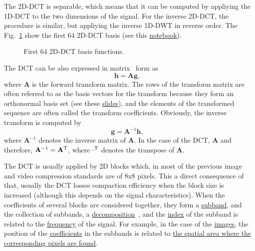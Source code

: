 The 2D-DCT is separable, which means that it can be computed by
appliying the 1D-DCT to the two dimensions of the signal. For the
inverse 2D-DCT, the procedure is similar, but appliying the inverse
1D-DWT in reverse order. The Fig.~\ref{fig:2D-DCT_basis} show the
first 64 2D-DCT basis (see this
\href{https://github.com/Sistemas-Multimedia/Sistemas-Multimedia.github.io/blob/master/milestones/07-DCT/DCT_basis.ipynb}{notebook}).

\begin{figure}
  \centering
  \caption{First 64 2D-DCT basis functions.}
  \label{fig:2D-DCT_basis}
\end{figure}

The DCT can be also expressed in matrix~\cite{sayood2017introduction}
form as
\begin{equation}
  {\mathbf h} = {\mathbf A}{\mathbf g},
\end{equation}
where ${\mathbf A}$ is the forward transform matrix. The rows of the
transform matrix are often referred to as the basis vectors for the
transform because they form an orthonormal basis set (see these
\href{https://cseweb.ucsd.edu/classes/fa17/cse166-a/lec13.pdf}{slides}),
and the elements of the transformed sequence are often called the
transform coefficients. Obviously, the inverse transform is computed
by
\begin{equation}
  {\mathbf g} = {\mathbf A}^{-1}{\mathbf h},
\end{equation}
where ${\mathbf A}^{-1}$ denotes the inverse matrix of ${\mathbf
  A}$. In the case of the DCT, ${\mathbf A}$ and therefore, ${\mathbf
  A}^{-1}={\mathbf A}^{\text T}$, where $\cdot^{\text T}$ denotes the
transpose of ${\mathbf A}$.

The DCT is usually applied by 2D blocks which, in most of the previous
image and video compression standards are of 8x8 pixels. This a direct
consequence of that, usually the DCT losses compaction efficiency when
the block size is increased (although this depends on the signal
characteristics). When the coefficients of several blocks are
considered together, they form a
\href{https://en.wikipedia.org/wiki/Sub-band_coding}{subband}, and the
collection of subbands, a
\href{https://en.wikipedia.org/wiki/Discrete_wavelet_transform}{decomposition}~\cite{vetterli2014foundations},
and the
\href{https://en.wikipedia.org/wiki/Array_data_structure#Element_identifier_and_addressing_formulas}{index}
of the subband is related to the
\href{https://en.wikipedia.org/wiki/Frequency}{frequency} of the
signal. For example, in the case of the
\href{https://en.wikipedia.org/wiki/Digital_image}{images}, the
position of the
\href{https://en.wikipedia.org/wiki/Coefficient}{coefficients} in the
subbands is related to
\href{https://github.com/Sistemas-Multimedia/Sistemas-Multimedia.github.io/blob/master/milestones/07-DCT/block_DCT_compression.ipynb}{the
  spatial area where the corresponding pixels are found}.

